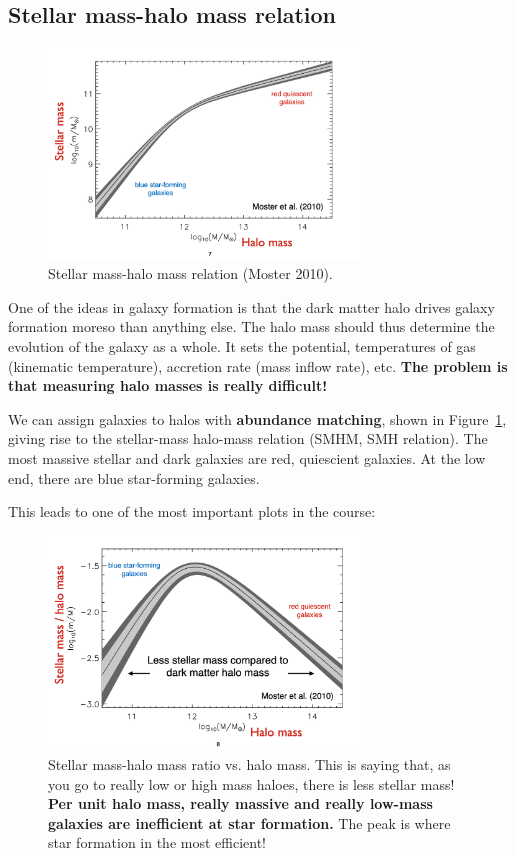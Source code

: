 \documentclass{article}
\begin{document}
\subsection{Stellar mass-halo mass relation}

\begin{figure}
    \centering
    \includegraphics[width=0.75\textwidth]{figs/Screen Shot 2021-09-03 at 11.29.07 AM.png}
    \caption{Stellar mass-halo mass relation (Moster 2010). }
    \label{fig:smhm_relation}
\end{figure}

One of the ideas in galaxy formation is that the dark matter halo drives galaxy formation moreso than anything else. The halo mass should thus determine the evolution of the galaxy as a whole. It sets the potential, temperatures of gas (kinematic temperature), accretion rate (mass inflow rate), etc. \textbf{The problem is that measuring halo masses is really difficult!}

We can assign galaxies to halos with \textbf{abundance matching}, shown in Figure~\ref{fig:smhm_relation}, giving rise to the stellar-mass halo-mass relation (SMHM, SMH relation). The most massive stellar and dark galaxies are red, quiescient galaxies. At the low end, there are blue star-forming galaxies. 

This leads to one of the most important plots in the course:

\begin{figure}
    \centering
\includegraphics[width=0.75\textwidth]{figs/Screen Shot 2021-09-03 at 11.29.23 AM.png}
    \caption{Stellar mass-halo mass ratio vs. halo mass. This is saying that, as you go to really low or high mass haloes, there is less stellar mass! \textbf{Per unit halo mass, really massive and really low-mass galaxies are inefficient at star formation.} The peak is where star formation in the most efficient!}
    \label{fig:smhm_ratio}
\end{figure}
\end{document}
